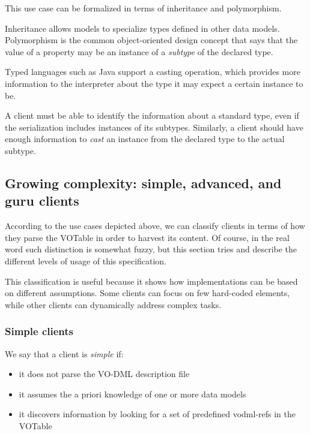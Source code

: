 \documentclass[11pt,a4paper]{ivoa}
\begin{document}
This use case can be formalized in terms of inheritance and
polymorphism.

Inheritance allows models to specialize types defined in other data
models. Polymorphism is the common object-oriented design concept that
says that the value of a property may be an instance of a \emph{subtype}
of the declared type.

Typed languages such as Java support a casting operation, which provides
more information to the interpreter about the type it may expect a
certain instance to be.

A client must be able to identify the information about a standard type,
even if the serialization includes instances of its subtypes. Similarly,
a client should have enough information to \emph{cast} an instance from
the declared type to the actual subtype.

\subsection{Growing complexity: simple, advanced, and guru
clients}\label{sec:clients}

According to the use cases depicted above, we can classify clients in
terms of how they parse the VOTable in order to harvest its content. Of
course, in the real word such distinction is somewhat fuzzy, but this
section tries and describe the different levels of usage of this
specification.

This classification is useful because it shows how implementations can
be based on different assumptions. Some clients can focus on few
hard-coded elements, while other clients can dynamically address complex
tasks.

\subsubsection{Simple clients}\label{simple-clients}

We say that a client is \emph{simple} if:

\begin{itemize}
\item
  it does not parse the VO-DML description file
\item
  it assumes the a priori knowledge of one or more data models
\item
  it discovers information by looking for a set of predefined vodml-refs
  in the VOTable
\end{itemize}
\end{document}
